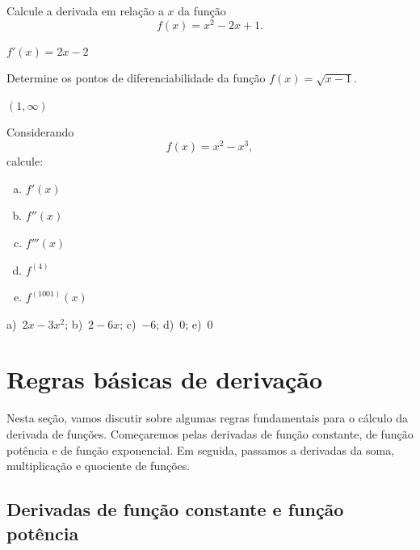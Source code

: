 \begin{exer}
  Calcule a derivada em relação a $x$ da função
  \begin{equation}
    f(x) = x^2 - 2x + 1.
  \end{equation}
\end{exer}
\begin{resp}
  $f'(x) = 2x - 2$
\end{resp}

\begin{exer}
  Determine os pontos de diferenciabilidade da função $f(x) = \sqrt{x-1}$.
\end{exer}
\begin{resp}
  $(1, \infty)$
\end{resp}

\begin{exer}
  Considerando
  \begin{equation}
    f(x) = x^2-x^3,
  \end{equation}
  calcule:
  \begin{enumerate}[a)]
  \item $f'(x)$
  \item $f''(x)$
  \item $f'''(x)$
  \item $f^{(4)}$
  \item $f^{(1001)}(x)$
  \end{enumerate}
\end{exer}
\begin{resp}
  a)~$2x-3x^2$; b)~$2-6x$; c)~$-6$; d)~$0$; e)~$0$
\end{resp}

\section{Regras básicas de derivação}\label{cap_deriv_sec_regras}

Nesta seção, vamos discutir sobre algumas regras fundamentais para o cálculo da derivada de funções. Começaremos pelas derivadas de função constante, de função potência e de função exponencial. Em seguida, passamos a derivadas da soma, multiplicação e quociente de funções.

\subsection{Derivadas de função constante e função potência}

